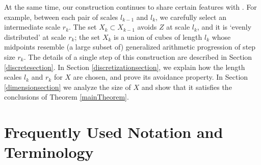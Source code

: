 At the same time, our construction continues to share certain features with \cite{MalabikaRob}. For example, between each pair of scales $l_{k-1}$ and $l_{k}$, we carefully select an intermediate scale $r_k$. The set $X_k \subset X_{k-1}$ avoids $Z$ at scale $l_k$, and it is `evenly distributed' at scale $r_k$; the set $X_k$ is a union of cubes of length $l_k$ whose midpoints resemble (a large subset of) generalized arithmetic progression of step size $r_k$. The details of a single step of this construction are described in Section \ref{discretesection}. In Section \ref{discretizationsection}, we explain how the length scales $l_k$ and $r_k$ for $X$ are chosen, and prove its avoidance property. In Section \ref{dimensionsection} we analyze the size of $X$ and show that it satisfies the conclusions of Theorem \ref{mainTheorem}.





\section{Frequently Used Notation and Terminology}\label{notationSection}


